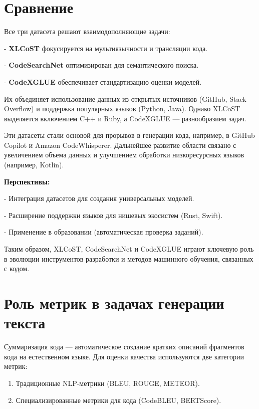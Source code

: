 \documentclass[14pt]{article}
\theoremstyle{definition}
\begin{document}
\newpage

\section{Сравнение}
Все три датасета решают взаимодополняющие задачи:

    
- \textbf{XLCoST} фокусируется на мультиязычности и трансляции кода.
    
- \textbf{CodeSearchNet} оптимизирован для семантического поиска.
    
- \textbf{CodeXGLUE} обеспечивает стандартизацию оценки моделей.


Их объединяет использование данных из открытых источников (GitHub, Stack Overflow) и поддержка популярных языков (Python, Java). Однако XLCoST выделяется включением C++ и Ruby, а CodeXGLUE — разнообразием задач.

Эти датасеты стали основой для прорывов в генерации кода, например, в GitHub Copilot и Amazon CodeWhisperer. Дальнейшее развитие области связано с увеличением объема данных и улучшением обработки низкоресурсных языков (например, Kotlin).

\textbf{Перспективы:}

    
- Интеграция датасетов для создания универсальных моделей.
    
- Расширение поддержки языков для нишевых экосистем (Rust, Swift).
    
- Применение в образовании (автоматическая проверка заданий).


Таким образом, XLCoST, CodeSearchNet и CodeXGLUE играют ключевую роль в эволюции инструментов разработки и методов машинного обучения, связанных с кодом.



\newpage
\section*{Роль метрик в задачах генерации текста}

Суммаризация кода — автоматическое создание кратких описаний фрагментов кода на естественном языке. Для оценки качества используются две категории метрик:

\begin{enumerate}
    \item Традиционные NLP-метрики (BLEU, ROUGE, METEOR).
    \item Специализированные метрики для кода (CodeBLEU, BERTScore).
\end{enumerate}
\end{document}
